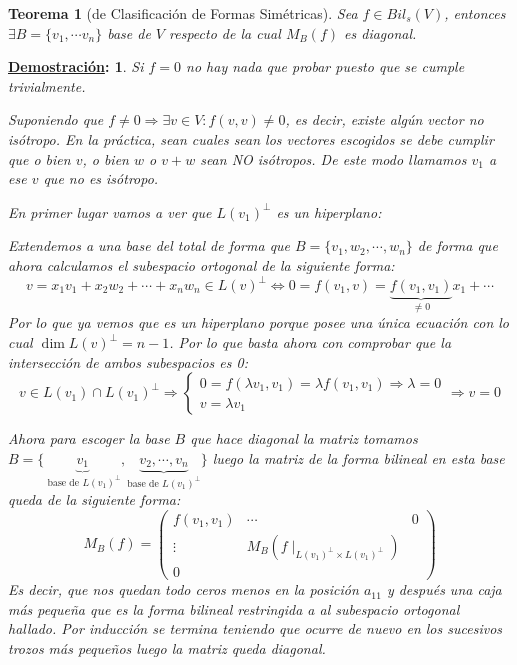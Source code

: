 \documentclass[10pt,a4paper,openright]{book}
\theoremstyle{break}
\newtheorem*{theo}{Teorema}
\newtheorem*{demo}{\underline{Demostración}:}
\begin{document}
\begin{theo}[de Clasificación de Formas Simétricas]
Sea $f\in Bil_s(V)$, entonces $\exists B=\{v_1, \cdots v_n\}$ base de $V$ respecto de la cual  $M_B(f)$ es diagonal.
\end{theo}
\begin{demo}
Si $f = 0$ no hay nada que probar puesto que se cumple trivialmente.

Suponiendo que $f\neq 0\Rightarrow \exists v\in V: f(v,v)\neq 0$, es decir, existe algún vector no isótropo. En la práctica, sean cuales sean los vectores escogidos se debe cumplir que o bien $v$, o bien $w$ o $v+w$ sean NO isótropos. De este modo llamamos $v_1$ a ese $v$ que no es isótropo.

En primer lugar vamos a ver que $L(v_1)^\perp$ es un hiperplano:

Extendemos a una base del total de forma que $B=\{v_1, w_2, \cdots , w_n\}$ de forma que ahora calculamos el subespacio ortogonal de la siguiente forma:
$$v= x_1v_1+x_2w_2+\cdots +x_nw_n\in L(v)^\perp \Leftrightarrow 0 = f(v_1,v)=\underbrace{f(v_1,v_1)}_{\neq 0}x_1+\cdots $$
Por lo que ya vemos que es un hiperplano porque posee una única ecuación con lo cual $\dim L(v)^\perp = n-1$. Por lo que basta ahora con comprobar que la intersección de ambos subespacios es 0:
$$v\in L(v_1)\cap L(v_1)^\perp \Rightarrow \begin{cases} 0 = f(\lambda v_1, v_1)= \lambda f(v_1,v_1)\Rightarrow \lambda = 0 \\ v = \lambda v_1\end{cases}\Rightarrow v = 0$$

Ahora para escoger la base $B$ que hace diagonal la matriz tomamos $B=\{\underbrace{v_1}_{\mbox{ base de }L(v_1)^\perp},\underbrace{ v_2, \cdots , v_n}_{\mbox{base de }L(v_1)^\perp}\}$ luego la matriz de la forma bilineal en esta base queda de la siguiente forma:
$$M_B(f)=\begin{pmatrix} f(v_1,v_1)&\cdots & 0 \\ \vdots & M_B(f\mid_{L(v_1)^\perp \times L(v_1)^\perp}) \\ 0 \end{pmatrix}$$
Es decir, que nos quedan todo ceros menos en la posición $a_{11}$ y después una caja más pequeña que es la forma bilineal restringida a al subespacio ortogonal hallado. Por inducción se termina teniendo que ocurre de nuevo en los sucesivos trozos más pequeños luego la matriz queda diagonal.
\end{demo}
\end{document}
